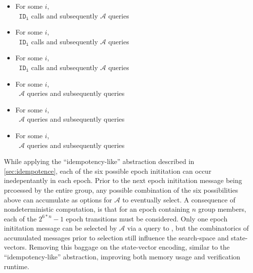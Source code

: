 \begin{itemize}
  \item For some \(i\),\\~\hspace{4em}\(\mathtt{ID_i}\) calls  and subsequently \(\mathcal{A}\) queries 
  \item For some \(i\),\\~\hspace{4em}\(\mathtt{ID_i}\) calls  and subsequently \(\mathcal{A}\) queries 
  \item For some \(i\),\\~\hspace{4em}\(\mathtt{ID_i}\) calls  and subsequently \(\mathcal{A}\) queries 
  \item For some \(i\),\\~\hspace{4em}\(\mathcal{A}\) queries     and subsequently queries 
  \item For some \(i\),\\~\hspace{4em}\(\mathcal{A}\) queries  and subsequently queries 
  \item For some \(i\),\\~\hspace{4em}\(\mathcal{A}\) queries  and subsequently queries 
\end{itemize}

While applying the ``idempotency-like'' abstraction described in \ref{sec:idempotence}, each of the six possible epoch inititation can occur inedepentantly in each epoch.
Prior to the next epoch inititation message being prcoessed by the entire group, any possible combination of the six possibilities above can accumulate as options for \(\mathcal{A}\) to eventually select.
A consequence of nondeterministic computation, is that for an epoch containing \(n\) group members, each of the \(2^{6*n} - 1\) epoch transitions must be considered.
Only one epoch inititation message can be selected by \(\mathcal{A}\) via a query to , but the combinatorics of accumulated messages prior to selection still influence the search-space and state-vectors.
Removing this baggage on the state-vector encoding, similar to the ``idempotency-like'' abstraction, improving both memory usage and verification runtime.

